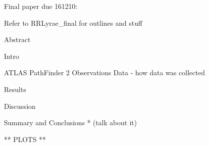 Final paper due 161210:

Refer to RRLyrae_final for outlines and stuff



Abstract

Intro

ATLAS PathFinder 2 Observations
	Data - how data was collected

Results

Discussion

Summary and Conclusions
 * (talk about it)


** PLOTS **
